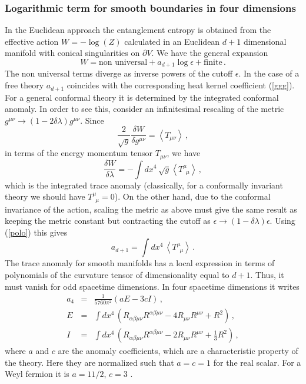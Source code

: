 \documentclass[11pt]{article}
\begin{document}
\subsubsection{Logarithmic term for smooth boundaries in four dimensions}
In the Euclidean approach the entanglement entropy is obtained from the effective action $W=-\log(Z)$ calculated in an Euclidean $d+1$ dimensional manifold with conical singularities on $\partial V$.  
We have the general expansion 
\begin{equation}
W=\textrm{non universal} +a_{d+1} \log{\epsilon}+\textrm{finite}\,.\label{polo}
\end{equation}
The non universal terms diverge as inverse powers of the cutoff $\epsilon$. In the case of a free theory $a_{d+1}$ coincides with the corresponding heat kernel coefficient (\ref{ggg}). For a general conformal theory it is determined by the integrated conformal anomaly. In order to see this, consider an infinitesimal rescaling of the metric $g^{\mu\nu}\rightarrow(1-2 \delta \lambda)g^{\mu\nu}$. Since 
\begin{equation}
\frac{2}{\sqrt{g}}\frac{\delta W}{\delta g^{\mu\nu}}=\left<T_{\mu\nu}\right>\,,
\end{equation}
in terms of the energy momentum tensor $T_{\mu\nu}$, we have 
\begin{equation}
\frac{\delta W}{\delta \lambda}=-\int dx^4\, \sqrt{g}  \left<T_{\,\,\,\mu}^\mu\right>\,,
\end{equation}
which is the integrated trace anomaly (classically, for a conformally invariant theory we should have $T_{\,\,\,\mu}^\mu=0$). On the other hand, due to the conformal invariance of the action, scaling the metric as above must give the same result as keeping the metric constant but contracting the cutoff as  $\epsilon\rightarrow (1-\delta \lambda)\epsilon$. Using (\ref{polo}) this gives  
\begin{equation}
a_{d+1}= \int dx^4\, \left<T_{\,\,\,\mu}^\mu\right>\,.
\end{equation}  
The trace anomaly for smooth manifolds has a local expression in terms of polynomials of the curvature tensor of dimensionality equal to $d+1$. Thus, it must vanish for odd spacetime dimensions. In four spacetime dimensions it writes \cite{anomalia}
\begin{eqnarray}
a_4&=& \frac{1}{5760 \pi^2} (a E - 3 c  I)\,,\label{gfgf}\\
E&=&\int dx^4\, (R_{\alpha \beta \mu \nu}R^{\alpha \beta \mu \nu}-4 R_{\mu \nu}R^{\mu \nu}+R^2)\,,\\
I&=& \int dx^4\, (R_{\alpha \beta \mu \nu}R^{\alpha \beta \mu \nu}-2 R_{\mu \nu}R^{\mu \nu}+\frac{1}{3} R^2)\,,\label{last}
\end{eqnarray}
where $a$ and $c$ are the anomaly coefficients, which are a characteristic property of the theory. Here they are normalized such that $a=c=1$ for the real scalar. For a Weyl fermion it is $a=11/2$, $c=3$ \cite{anomalia}.
\end{document}
